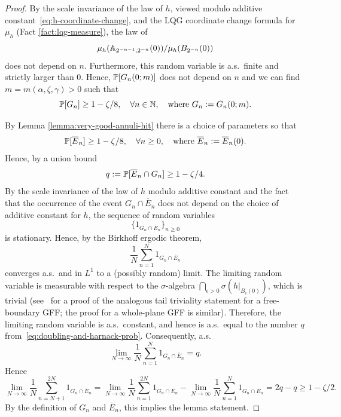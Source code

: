 \documentclass[12pt]{amsart}
\numberwithin{equation}{section}
\begin{document}
	\begin{proof}
		By the scale invariance of the law of $h$, viewed modulo additive constant~\eqref{eq:h-coordinate-change}, and the LQG coordinate change formula for $\mu_{h}$ (Fact \ref{fact:lqg-measure}), the law of  
		\[
		\mu_{h}(\A_{2^{-n-1}, 2^{-n}}(0))/\mu_{h}(B_{2^{-n}}(0))
		\]
		does not depend on $n$. 
		Furthermore, this random variable is a.s.\ finite and strictly larger than 0. Hence, 
		$   \P[G_n(0; m)]$ does not depend on $n$ and we can find $m = m(\alpha,\zeta,\gamma) > 0$ such that
		\begin{equation} \label{eq:doubling-prob}
		\P[G_n  ] \geq 1 - \zeta /8 , \quad\forall n\in\N ,\quad \text{where $G_n := G_n(0; m)$} .
		\end{equation} 
		
		By  Lemma \ref{lemma:very-good-annuli-hit} there is a choice of parameters so that 
		\begin{equation} \label{eq:harnack-prob}
		\P[\overline E_n] \geq 1 - \zeta /8 , \quad \forall n \geq 0 ,\quad \text{where $\overline E_n := \overline E_n(0)$} .
		\end{equation}
		Hence, by a union bound
		\begin{equation} \label{eq:doubling-and-harnack-prob}
		q := \P[\overline E_n \cap G_n] \geq 1- \zeta/4.
		\end{equation}
		By the scale invariance of the law of $h$ modulo additive constant and the fact that the occurrence of the event $G_n \cap \overline E_n$ does not depend on the choice of additive constant for $h$, the sequence of random variables
		\[
		\{1_{G_n \cap \overline E_n}\}_{n \geq 0}
		\]
		is stationary. 
		Hence, by the Birkhoff ergodic theorem, 
		\[
		\frac{1}{N} \sum_{n=1}^N  1_{G_n \cap \overline E_n}
		\]
		converges a.s.\ and in $L^1$ to a (possibly random) limit. The limiting random variable is measurable with respect to the $\sigma$-algebra $\bigcap_{\epsilon > 0} \sigma(h|_{B_\epsilon(0)})$, which is trivial (see~\cite[Lemma 7.2]{duplantier2014liouville} for a proof of the analogous tail triviality statement for a free-boundary GFF; the proof for a whole-plane GFF is similar). 
		Therefore, the limiting random variable is a.s.\ constant, and hence is a.s.\ equal to the number $q$ from~\eqref{eq:doubling-and-harnack-prob}. Consequently, a.s.\ 
		\begin{equation}
		\lim_{N \to \infty} \frac{1}{N} \sum_{n=1}^N  1_{G_n \cap \overline E_n} = q. 
		\end{equation}
		Hence
		\begin{equation}
		\lim_{N \to \infty} \frac{1}{N} \sum_{n=N+1}^{2N}  1_{G_n \cap \overline E_n}
		= \lim_{N \to\infty} \frac{1}{N} \sum_{n=1}^{2N}  1_{G_n \cap \overline E_n} - \lim_{N \to\infty} \frac{1}{N} \sum_{n=1}^{N}  1_{G_n \cap \overline E_n} 
		= 2q - q
		\geq 1-\zeta/2 .
		\end{equation}
		By the definition of $G_n$ and $\overline E_n$, this implies the lemma statement. 
	\end{proof}
	
\end{document}
